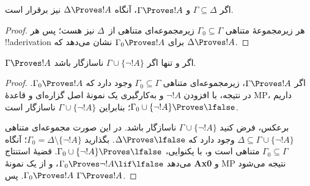 \documentclass[../../../include/open-logic-section]{subfiles}
\begin{document}
      {}
      {}


\begin{prop}[یکنوایی] اگر $\Gamma \subseteq \Delta$ و $\Gamma \Proves !A$،
آنگاه $\Delta \Proves !A$ نیز برقرار است.
\end{prop}

\begin{proof}
هر زیرمجموعهٔ متناهی $\Gamma_0 \subseteq \Gamma$ زیرمجموعه‌ای متناهی
از~$\Delta$ نیز هست؛ پس هر !!a{derivation} برای $\Gamma_0 \Proves !A$
نشان می‌دهد که $\Delta \Proves !A$.
\end{proof}

\begin{prop}
$\Gamma \Proves !A$ اگر و تنها اگر $\Gamma\cup \{\lnot!A \}$ ناسازگار باشد.
\end{prop}

\begin{proof}
اگر $\Gamma \Proves !A$، زیرمجموعه‌ای متناهی
$\Gamma_0\subseteq\Gamma$ وجود دارد که $\Gamma_0\Proves !A$.
در نتیجه، با افزودن $\lnot !A$ و به‌کارگیری یک نمونهٔ اصل گزاره‌ای و
قاعدهٔ MP، داریم
$\Gamma_0\cup\{\lnot !A\}\Proves\lfalse$؛ بنابراین
$\Gamma\cup\{\lnot !A\}$ ناسازگار است.

برعکس، فرض کنید $\Gamma\cup\{\lnot !A\}$ ناسازگار باشد. در این صورت
مجموعه‌ای متناهی
$\Delta\subseteq\Gamma\cup\{\lnot !A\}$ وجود دارد که
$\Delta\Proves\lfalse$. بگذارید
$\Gamma_0=\Delta\setminus\{\lnot !A\}$؛ آنگاه
$\Gamma_0\subseteq\Gamma$ متناهی است و، با یکنوایی،
$\Gamma_0\cup\{\lnot !A\}\Proves\lfalse$. قضیهٔ استنتاج می‌دهد
$\Gamma_0\Proves\lnot !A\lif\lfalse$، و از یک نمونهٔ \textbf{Ax0}
و MP نتیجه می‌شود $\Gamma_0\Proves !A$. پس $\Gamma\Proves !A$.
\end{proof}
\end{document}
